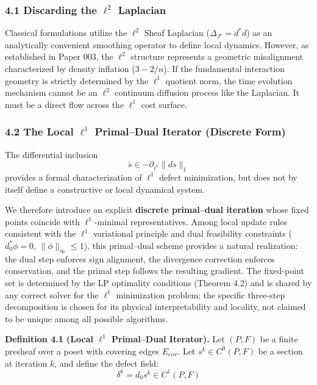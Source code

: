 \documentclass[
]{article}
\begin{document}
\subsubsection{\texorpdfstring{4.1 Discarding the \(\ell^2\)
Laplacian}{4.1 Discarding the \textbackslash ell\^{}2 Laplacian}}\label{discarding-the-ell2-laplacian}

Classical formulations utilize the \(\ell^2\) Sheaf Laplacian
(\(\Delta_\mathcal{F} = d^*d\)) as an analytically convenient smoothing
operator to define local dynamics. However, as established in Paper 003,
the \(\ell^2\) structure represents a geometric misalignment
characterized by density inflation (\(3 - 2/n\)). If the fundamental
interaction geometry is strictly determined by the \(\ell^1\) quotient
norm, the time evolution mechanism cannot be an \(\ell^2\) continuum
diffusion process like the Laplacian. It must be a direct flow across
the \(\ell^1\) cost surface.

\subsubsection{\texorpdfstring{4.2 The Local \(\ell^1\) Primal--Dual
Iterator (Discrete
Form)}{4.2 The Local \textbackslash ell\^{}1 Primal--Dual Iterator (Discrete Form)}}\label{the-local-ell1-primaldual-iterator-discrete-form}

The differential inclusion \[ \dot{s} \in -\partial_{\ell^1} \|ds\|_1 \]
provides a formal characterization of \(\ell^1\) defect minimization,
but does not by itself define a constructive or local dynamical system.

We therefore introduce an explicit \textbf{discrete primal--dual
iteration} whose fixed points coincide with \(\ell^1\)-minimal
representatives. Among local update rules consistent with the \(\ell^1\)
variational principle and dual feasibility constraints
(\(d_0^* \phi = 0\), \(\|\phi\|_\infty \le 1\)), this primal--dual
scheme provides a natural realization: the dual step enforces sign
alignment, the divergence correction enforces conservation, and the
primal step follows the resulting gradient. The fixed-point set is
determined by the LP optimality conditions (Theorem 4.2) and is shared
by any correct solver for the \(\ell^1\) minimization problem; the
specific three-step decomposition is chosen for its physical
interpretability and locality, not claimed to be unique among all
possible algorithms.

\textbf{Definition 4.1 (Local \(\ell^1\) Primal--Dual Iterator).} Let
\((P, F)\) be a finite presheaf over a poset with covering edges
\(E_{\mathrm{cov}}\). Let \(s^k \in C^0(P, F)\) be a section at
iteration \(k\), and define the defect field:
\[ \delta^k = d_0 s^k \in C^1(P, F) \]
\end{document}
